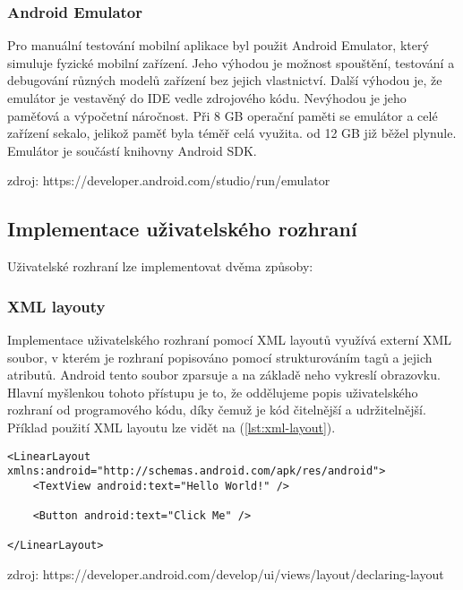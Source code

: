 \subsubsection *{Android Emulator}

Pro manuální testování mobilní aplikace byl použit Android Emulator, který simuluje fyzické mobilní zařízení. Jeho výhodou je možnost spouštění, testování a debugování různých modelů zařízení bez jejich vlastnictví. Další výhodou je, že emulátor je vestavěný do IDE vedle zdrojového kódu. Nevýhodou je jeho paměťová a výpočetní náročnost. Při 8 GB operační paměti se emulátor a celé zařízení sekalo, jelikož paměť byla téměř celá využita. od 12 GB již běžel plynule. Emulátor je součástí knihovny Android SDK.



zdroj: https://developer.android.com/studio/run/emulator

\subsection {Implementace uživatelského rozhraní}
Uživatelské rozhraní lze implementovat dvěma způsoby:

\subsubsection*{XML layouty}
Implementace uživatelského rozhraní pomocí XML layoutů využívá externí XML soubor, v kterém je rozhraní popisováno pomocí strukturováním tagů a jejich atributů. Android tento soubor zparsuje a na základě neho vykreslí obrazovku. Hlavní myšlenkou tohoto přístupu je to, že oddělujeme popis uživatelského rozhraní od programového kódu, díky čemuž je kód čitelnější a udržitelnější. Příklad použití XML layoutu lze vidět na (\ref{lst:xml-layout}).

\begin{lstlisting}[caption={XML layout vykreslující vedle sebe text a tlačítko.}, label={lst:xml-layout}]
<LinearLayout xmlns:android="http://schemas.android.com/apk/res/android">
	<TextView android:text="Hello World!" />

	<Button	android:text="Click Me" />

</LinearLayout>
\end{lstlisting}

zdroj: https://developer.android.com/develop/ui/views/layout/declaring-layout

